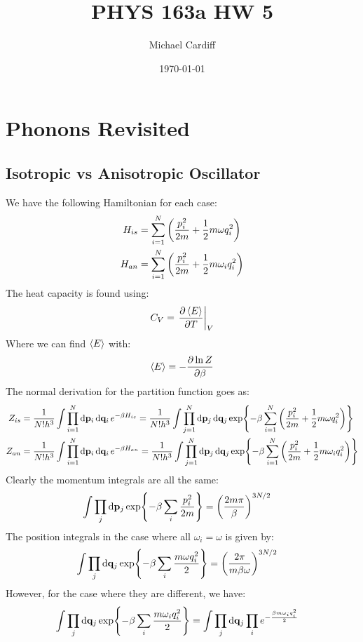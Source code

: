 \documentclass[12pt]{article}
\title{\vspace{-3em}PHYS 163a HW 5}
\author{Michael Cardiff}
\date{\today}
\begin{document}
\maketitle

\section{Phonons Revisited}
\subsection{Isotropic vs Anisotropic Oscillator}
We have the following Hamiltonian for each case:
\begin{align*}
  H_{is}&=\sum_{i=1}^N\qty(\frac{p_i^2}{2m}+\frac12m\omega q_i^2)\\
  H_{an}&=\sum_{i=1}^N\qty(\frac{p_i^2}{2m}+\frac12m\omega_iq_i^2)
\end{align*}
The heat capacity is found using:
\begin{align*}
  C_V=\eval{\pdv{\ev{E}}{T}}_V
\end{align*}
Where we can find $\ev{E}$ with:
\begin{align*}
  \ev{E}=-\pdv{\ln Z}{\beta}
\end{align*}
The normal derivation for the partition function goes as:
\begin{align*}
  Z_{is}&=\frac1{N!h^3}\int\prod_{i=1}^N\dd{\vb{p}_i}\dd{\vb{q}_i}
  e^{-\beta H_{is}}=\frac1{N!h^3}\int\prod_{j=1}^N\dd{\vb{p}_j}\dd{\vb{q}_j}
  \exp{-\beta\sum_{i=1}^N\qty(\frac{p_i^2}{2m}+\frac12m\omega q_i^2)}\\
  Z_{an}&=\frac1{N!h^3}\int\prod_{i=1}^N\dd{\vb{p}_i}\dd{\vb{q}_i}
  e^{-\beta H_{an}}=\frac1{N!h^3}\int\prod_{j=1}^N\dd{\vb{p}_j}\dd{\vb{q}_j}
  \exp{-\beta\sum_{i=1}^N\qty(\frac{p_i^2}{2m}+\frac12m\omega_iq_i^2)}
\end{align*}
Clearly the momentum integrals are all the same:
\begin{align*}
  \int\prod_j\dd{\vb{p}_j}\exp{-\beta\sum_i\frac{p_i^2}{2m}}
  &=\qty(\frac{2m\pi}{\beta})^{3N/2}
\end{align*}
The position integrals in the case where all $\omega_i=\omega$ is given by:
\begin{align*}
  \int\prod_j\dd{\vb{q}_j}\exp{-\beta\sum_i\frac{m\omega q_i^2}{2}}
  &=\qty(\frac{2\pi}{m\beta\omega})^{3N/2}
\end{align*}
However, for the case where they are different, we have:
\begin{align*}
  \int\prod_j\dd{\vb{q}_j}\exp{-\beta\sum_i\frac{m\omega_iq_i^2}{2}}
  &=\int\prod_j\dd{\vb{q}_j}\prod_ie^{-\frac{\beta m\omega_iq_i^2}{2}}
\end{align*}
\end{document}
